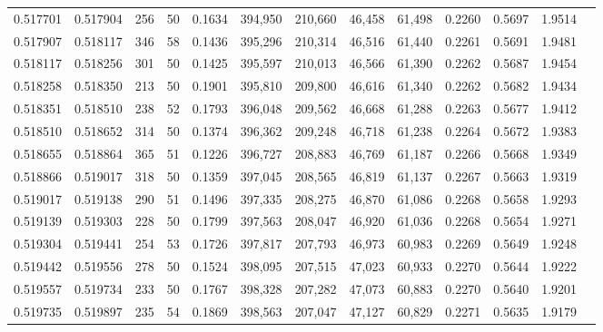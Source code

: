\begin{tabular}{rrrrrrrrrrrrr}
0.517701 & 0.517904 &   256 &  50 &                                     0.1634 & 394,950 & 210,660 &  46,458 &  61,498 & 0.2260 & 0.5697 & 1.9514 \\
0.517907 & 0.518117 &   346 &  58 &                                     0.1436 & 395,296 & 210,314 &  46,516 &  61,440 & 0.2261 & 0.5691 & 1.9481 \\
0.518117 & 0.518256 &   301 &  50 &                                     0.1425 & 395,597 & 210,013 &  46,566 &  61,390 & 0.2262 & 0.5687 & 1.9454 \\
0.518258 & 0.518350 &   213 &  50 &                                     0.1901 & 395,810 & 209,800 &  46,616 &  61,340 & 0.2262 & 0.5682 & 1.9434 \\
0.518351 & 0.518510 &   238 &  52 &                                     0.1793 & 396,048 & 209,562 &  46,668 &  61,288 & 0.2263 & 0.5677 & 1.9412 \\
0.518510 & 0.518652 &   314 &  50 &                                     0.1374 & 396,362 & 209,248 &  46,718 &  61,238 & 0.2264 & 0.5672 & 1.9383 \\
0.518655 & 0.518864 &   365 &  51 &                                     0.1226 & 396,727 & 208,883 &  46,769 &  61,187 & 0.2266 & 0.5668 & 1.9349 \\
0.518866 & 0.519017 &   318 &  50 &                                     0.1359 & 397,045 & 208,565 &  46,819 &  61,137 & 0.2267 & 0.5663 & 1.9319 \\
0.519017 & 0.519138 &   290 &  51 &                                     0.1496 & 397,335 & 208,275 &  46,870 &  61,086 & 0.2268 & 0.5658 & 1.9293 \\
0.519139 & 0.519303 &   228 &  50 &                                     0.1799 & 397,563 & 208,047 &  46,920 &  61,036 & 0.2268 & 0.5654 & 1.9271 \\
0.519304 & 0.519441 &   254 &  53 &                                     0.1726 & 397,817 & 207,793 &  46,973 &  60,983 & 0.2269 & 0.5649 & 1.9248 \\
0.519442 & 0.519556 &   278 &  50 &                                     0.1524 & 398,095 & 207,515 &  47,023 &  60,933 & 0.2270 & 0.5644 & 1.9222 \\
0.519557 & 0.519734 &   233 &  50 &                                     0.1767 & 398,328 & 207,282 &  47,073 &  60,883 & 0.2270 & 0.5640 & 1.9201 \\
0.519735 & 0.519897 &   235 &  54 &                                     0.1869 & 398,563 & 207,047 &  47,127 &  60,829 & 0.2271 & 0.5635 & 1.9179 \\

\end{tabular}
